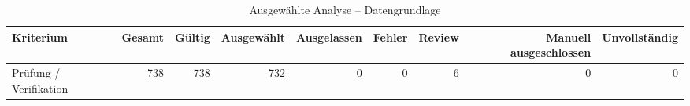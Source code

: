 \begin{table}[htbp]
\centering
\caption{Ausgewählte Analyse -- Datengrundlage}
\begin{tabular}{lrrrrrrrr}
\toprule
Kriterium & Gesamt & Gültig & Ausgewählt & Ausgelassen & Fehler & Review & Manuell ausgeschlossen & Unvollständig \\
\midrule
Prüfung / Verifikation & 738 & 738 & 732 & 0 & 0 & 6 & 0 & 0 \\
\bottomrule
\end{tabular}
\end{table}
